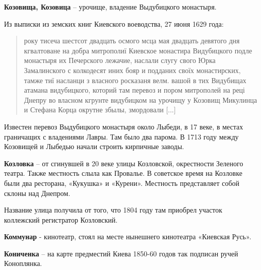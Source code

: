\medskip



\textbf{Козовища, Козовица} – урочище, владение Выдубицкого монастыря.

Из выписки из земских книг Киевского воеводства, 27 июня 1629 года:

\begin{quotation}
року тисеча шестсот двадцать осмого мсца мая двадцать девятого дня кгвалтоване на добра митрополиї Киевское монастира Видубицкого подле монастыря их Печерского лежачие, наслали слугу свого Юрка Замалинского с колкодесят иних бояр и подданих своїх монастирских, тамже тиї насланци з власного росказаня велм. вашой в тих Видубищах атамана видубицкого, которий там перевоз и пором митрополей на реці Днепру во власном кгрунте видубицком на урочищу у Козовищ Микулинца и Стефана Корца окрутне збылы, змордовали [...] 
\end{quotation}


Известен перевоз Выдубицкого монастыря около Лыбеди, в 17 веке, в местах граничащих с владениями Лавры. Там было два парома. В 1713 году между Козовищей и Лыбедью начали строить кирпичные заводы.\\

\medskip


\textbf{Козловка} – от сгинувшей в 20 веке улицы Козловской, окрестности Зеленого театра. Также местность слыла как Провалье. В советское время на Козловке были два ресторана, «Кукушка» и «Курени». Местность представляет собой склоны над Днепром.

Название улица получила от того, что 1804 году там приобрел участок коллежский регистратор Козловский.\\

\medskip


\textbf{Коммунар} - кинотеатр, стоял на месте нынешнего кинотеатра «Киевская Русь».\\

\medskip


\textbf{Кониченка} – на карте предместий Киева 1850-60 годов так подписан ручей Коноплянка.\\

